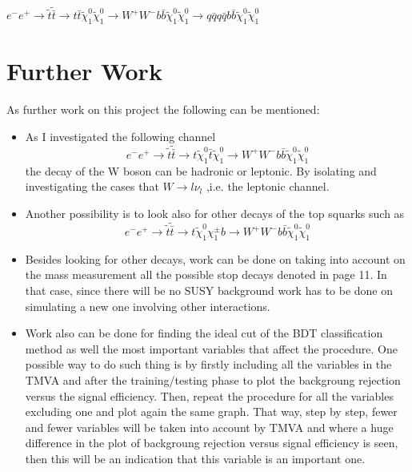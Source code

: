 \documentclass[12pt,a4paper]{report}
\begin{document}
$e^{-}e^{+} \rightarrow \tilde{t}\tilde{\bar{t}} \rightarrow t \bar{t}\tilde{\chi}_{1}^{0}
 \tilde{\chi}^{0}_{1} \rightarrow
 W^{+}W^{-} b \bar{b} \tilde{\chi}_{1}^{0}  \tilde{\chi}_{1}^{0} \rightarrow 
 q \bar{q} q \bar{q} b \bar{b} \tilde{\chi}_{1}^{0}  \tilde{\chi}_{1}^{0}$
 
 







\chapter{Further Work}

As further work on this project the following can be mentioned:

\begin{itemize}
 \item As I investigated the following channel
    \begin{equation}
      e^{-} e^{+} \rightarrow \tilde{t} \tilde{\bar{t}} \rightarrow t\tilde{\chi}_{1}^{0} \bar{t}\tilde{\chi}_{1}^{0}
      \rightarrow W^{+}W^{-}b\bar{b} \tilde{\chi}_{1}^{0} \tilde{\chi}_{1}^{0}
    \end{equation}
the decay of the W boson can be hadronic or leptonic. By isolating and investigating 
the cases that $W\rightarrow l\nu_{l}$
,i.e. the leptonic channel. 

\item Another possibility is to look also for other decays of the top squarks such as 
    \begin{equation}
      e^{-}e^{+} \rightarrow \tilde{t}\tilde{\bar{t}} \rightarrow t \tilde{\chi}_{1}^{0}
      \chi^{\pm}_{1}b \rightarrow
      W^{+}W^{-} b \bar{b} \tilde{\chi}_{1}^{0}  \tilde{\chi}_{1}^{0}
    \end{equation}

\item Besides looking for other decays, work can be done on taking into account on the mass measurement all
the possible stop decays denoted in page 11. In that case, since there will be no SUSY background work has to
be done on simulating a new one involving other interactions.
    
\item Work also can be done for finding the ideal cut of the BDT classification method as well the most 
important variables that affect the procedure. One possible way to do such thing is by firstly including
all the variables in the TMVA and after the training/testing phase to plot the backgroung rejection versus 
the signal efficiency. Then, repeat the procedure for all the variables excluding one and plot again the same 
graph. That way, step by step, fewer and fewer variables will be taken into account by TMVA and where a huge 
difference in the plot of backgroung rejection versus signal efficiency is seen, then this will be an 
indication that this variable is an important one.

\end{itemize}


\newpage



\end{document}

